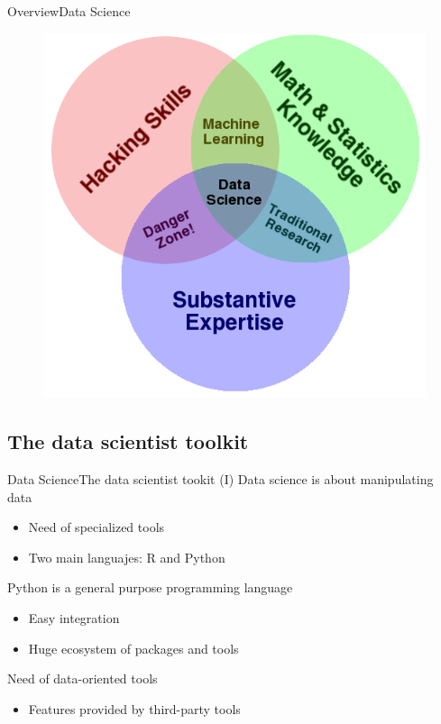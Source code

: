\documentclass[10pt,compress]{beamer} %
\begin{document}
\begin{frame}{Overview}{Data Science}
	\begin{figure}
		\includegraphics[scale=0.35]{figs/Data_Science_VD.png}	
	\end{figure}				
\end{frame}

\subsection{The data scientist toolkit}

\begin{frame}{Data Science}{The data scientist tookit (I)}
	Data science is about manipulating data
	\begin{itemize}
		\item Need of specialized tools
		\item Two main languajes: R and Python
	\end{itemize}
	Python is a general purpose programming language
	\begin{itemize}
		\item Easy integration 
		\item Huge ecosystem of packages and tools
	\end{itemize}
	Need of data-oriented tools
	\begin{itemize}
		\item Features provided by third-party tools
	\end{itemize}

\end{frame}
\end{document}
